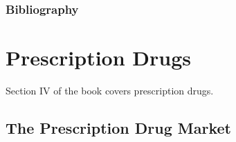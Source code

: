 \documentclass[
  letterpaper,
  DIV=11,
  numbers=noendperiod]{scrreport}
\theoremstyle{definition}
\theoremstyle{remark}
\begin{document}
\hypertarget{bibliography-2}{%
\section*{Bibliography}\label{bibliography-2}}


\part{Prescription Drugs}

Section IV of the book covers prescription drugs.

\hypertarget{the-prescription-drug-market}{%
\chapter*{The Prescription Drug
Market}\label{the-prescription-drug-market}}
\end{document}
